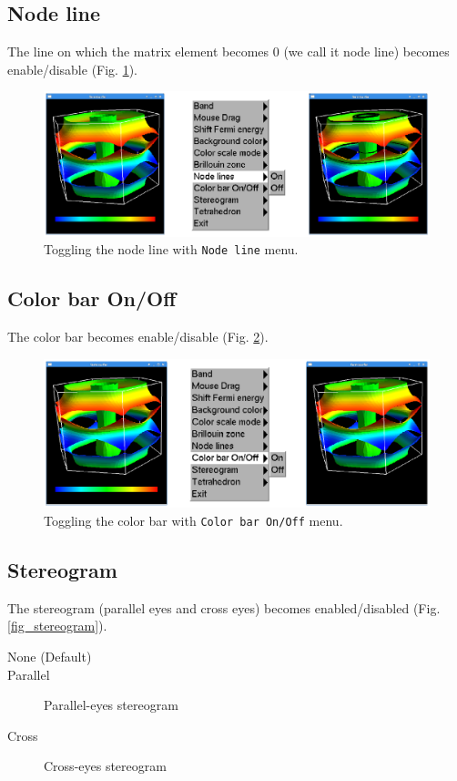\documentclass[12pt]{article}
\begin{document}
\subsection{Node line}

The line on which the matrix element becomes 0 (we call it node line)
becomes enable/disable (Fig. \ref{fig_nodeline}).

\begin{figure}[!ht]
  \includegraphics[width=17cm]{figs/nodeline.eps}
  \caption{Toggling the node line with \texttt{Node line} menu.}
  \label{fig_nodeline}
\end{figure}

\subsection{Color bar On/Off}

The color bar becomes enable/disable (Fig. \ref{fig_colorbar}). 

\begin{figure}[!ht]
  \includegraphics[width=17cm]{figs/colorbar.eps}
  \caption{Toggling the color bar with \texttt{Color bar On/Off} menu.}
  \label{fig_colorbar}
\end{figure}

\subsection{Stereogram}

The stereogram (parallel eyes and  cross eyes) becomes 
enabled/disabled (Fig. \ref{fig_stereogram}).
\begin{description}
\item[None (Default)]   
\item[Parallel] Parallel-eyes stereogram 
\item[Cross] Cross-eyes stereogram 
\end{description}
\end{document}
